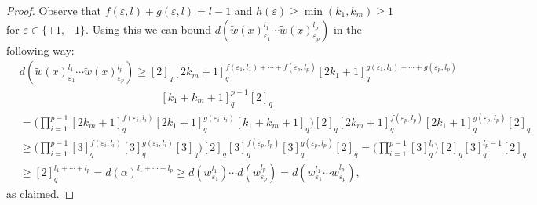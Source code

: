\documentclass[10pt,a4paper]{amsart}
\newcommand{\eps}{\varepsilon}
\begin{document}
\begin{proof}
Observe that $f(\eps,l)+g(\eps,l)=l-1$ and $h(\eps)\ge \min(k_1,k_m)\ge 1$ for $\eps\in \{+1,-1\}$. Using this we can bound $d( \widetilde{w}(x)^{l_1}_{\eps_1}\cdots
\widetilde{w}(x)^{l_p}_{\eps_p})$ in the following way:
\begin{align*}
&d( 
\widetilde{w}(x)^{l_1}_{\eps_1}\cdots
\widetilde{w}(x)^{l_p}_{\eps_p})\ge 
[2]_q  
[2k_m+1]_q^{f(\eps_1,l_1)+\cdots+
f(\eps_p,l_p)}
[2k_1+1]_q^{g(\eps_1,l_1)+\cdots+
g(\eps_p,l_p)}\\
&\quad\quad\quad\quad\quad\quad
\quad\quad\quad\quad\quad\,\;\;\;\;\;\;
[ k_1+k_m+1]_q^{p-1} [2]_q\\
&=
\bigl(\prod_{i=1}^{p-1}
[2k_m+1]_q^{f(\eps_i,l_i)}
[2k_1+1]_q^{g(\eps_i,l_i)} [k_1+k_m+1]_q \bigr)
[2]_q 
[2k_m+1]_q^{f(\eps_p,l_p)}
[2k_1+1]_q^{g(\eps_p,l_p)} [2]_q\\
&\ge 
\bigl(\prod_{i=1}^{p-1}
[3]_q^{f(\eps_i,l_i)}
[3]_q^{g(\eps_i,l_i)} [3]_q \bigr)
[2]_q 
[3]_q^{f(\eps_p,l_p)}
[3]_q^{g(\eps_p,l_p)} [2]_q=
\bigl(\prod_{i=1}^{p-1}
[3]_q^{l_i} \bigr)
[2]_q 
[3]_q^{l_p-1 } [2]_q\\
&\ge 
[2]_q^{l_1+\cdots + l_p}=
d(\alpha)^{l_1+\cdots + l_p}\ge 
d(w^{l_1}_{\eps_1})\cdots d(w^{l_p}_{\eps_p})= 
d(w^{l_1}_{\eps_1} \cdots w^{l_p}_{\eps_p}),
\end{align*}
as claimed.
\end{proof}
\end{document}
